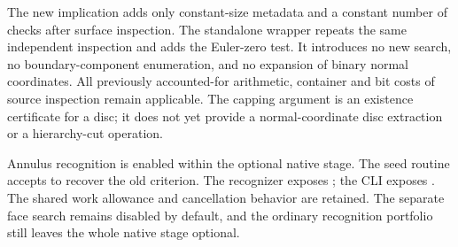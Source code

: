 The new implication adds only constant-size metadata and a constant number
of checks after surface inspection. The standalone wrapper repeats the
same independent inspection and adds the Euler-zero test. It introduces
no new search, no boundary-component enumeration, and no expansion of
binary normal coordinates. All previously accounted-for arithmetic,
container and bit costs of source inspection remain applicable. The
capping argument is an existence certificate for a disc; it does not yet
provide a normal-coordinate disc extraction or a hierarchy-cut operation.

Annulus recognition is enabled within the optional native stage.
The seed routine accepts  to recover the old criterion.
The recognizer exposes ; the CLI exposes
. The shared
work allowance and cancellation behavior are retained. The separate face
search remains disabled by default, and the ordinary recognition portfolio
still leaves the whole native stage optional.


